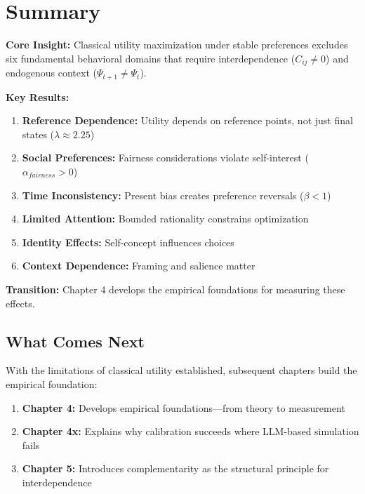 \section{Summary}
\label{sec:ch3-summary}

\begin{tcolorbox}[
    colback=blue!5!white,
    colframe=blue!75!black,
    title={\textbf{Chapter 3 Summary: Limits of Classical Utility}}
]

\textbf{Core Insight:} Classical utility maximization under stable preferences excludes six fundamental behavioral domains that require interdependence ($C_{ij} \neq 0$) and endogenous context ($\Psi_{t+1} \neq \Psi_t$).

\textbf{Key Results:}
\begin{enumerate}[nosep]
    \item \textbf{Reference Dependence:} Utility depends on reference points, not just final states ($\lambda \approx 2.25$)
    \item \textbf{Social Preferences:} Fairness considerations violate self-interest ($\alpha_{fairness} > 0$)
    \item \textbf{Time Inconsistency:} Present bias creates preference reversals ($\beta < 1$)
    \item \textbf{Limited Attention:} Bounded rationality constrains optimization
    \item \textbf{Identity Effects:} Self-concept influences choices
    \item \textbf{Context Dependence:} Framing and salience matter
\end{enumerate}

\textbf{Transition:} Chapter 4 develops the empirical foundations for measuring these effects.
\end{tcolorbox}

\subsection{What Comes Next}
\label{sec:ch3-next}

With the limitations of classical utility established, subsequent chapters build the empirical foundation:

\begin{enumerate}[nosep]
    \item \textbf{Chapter 4:} Develops empirical foundations---from theory to measurement
    \item \textbf{Chapter 4x:} Explains why calibration succeeds where LLM-based simulation fails
    \item \textbf{Chapter 5:} Introduces complementarity as the structural principle for interdependence
\end{enumerate}

